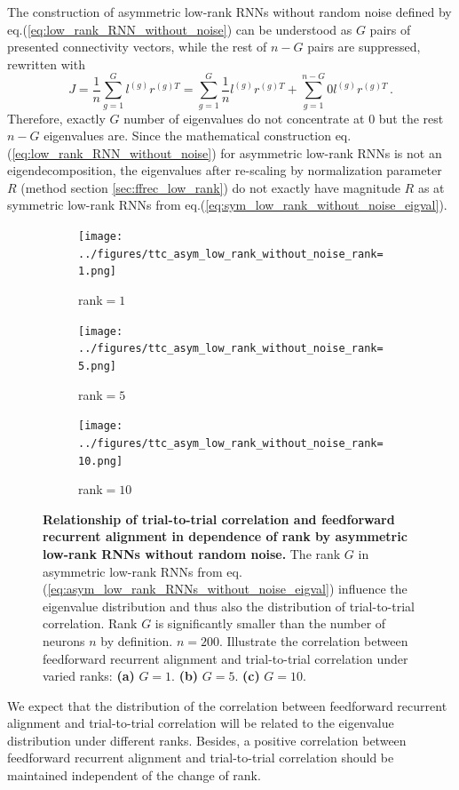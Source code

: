 \documentclass[11pt]{article}
\begin{document}
	The construction of asymmetric low-rank RNNs without random noise defined by eq.(\ref{eq:low_rank_RNN_without_noise}) can be understood as $G$ pairs of presented connectivity vectors, while the rest of $n-G$ pairs are suppressed, rewritten with
		\begin{equation} \label{eq:asym_low_rank_RNNs_without_noise_eigval}
			J = \frac{1}{n} \sum_{g=1}^{G} l^{(g)} r^{(g)T} = \sum_{g=1}^{G} \frac{1}{n} l^{(g)} r^{(g)T} + \sum_{g=1}^{n-G} 0 l^{(g)} r^{(g)T} \, .
		\end{equation}
	Therefore, exactly $G$ number of eigenvalues do not concentrate at $0$ but the rest $n-G$ eigenvalues are. Since the mathematical construction eq.(\ref{eq:low_rank_RNN_without_noise}) for asymmetric low-rank RNNs is not an eigendecomposition, the eigenvalues after re-scaling by normalization parameter $R$ (method section \ref{sec:ffrec_low_rank}) do not exactly have magnitude $R$ as at symmetric low-rank RNNs from eq.(\ref{eq:sym_low_rank_without_noise_eigval}).	
	
		\begin{figure}[H]
			\centering
			\begin{subfigure}[b]{0.3\textwidth}
				\texttt{[image: ../figures/ttc\_asym\_low\_rank\_without\_noise\_rank=1.png]}
				\caption{rank$=1$}
			\end{subfigure}
			\begin{subfigure}[b]{0.3\textwidth}
				\texttt{[image: ../figures/ttc\_asym\_low\_rank\_without\_noise\_rank=5.png]}
				\caption{rank$=5$}
			\end{subfigure}
			\begin{subfigure}[b]{0.3\textwidth}
				\texttt{[image: ../figures/ttc\_asym\_low\_rank\_without\_noise\_rank=10.png]}
				\caption{rank$=10$}
			\end{subfigure} 
			\caption{\textbf{Relationship of trial-to-trial correlation and feedforward recurrent alignment in dependence of rank by asymmetric low-rank RNNs without random noise.} The rank $G$ in asymmetric low-rank RNNs from eq.(\ref{eq:asym_low_rank_RNNs_without_noise_eigval}) influence the eigenvalue distribution and thus also the distribution of trial-to-trial correlation. Rank $G$ is significantly smaller than the number of neurons $n$ by definition. $n=200$. Illustrate the correlation between feedforward recurrent alignment and trial-to-trial correlation under varied ranks: \textbf{(a)} $G=1$. \textbf{(b)} $G=5$. \textbf{(c)} $G=10$.} 
			\label{fig:ttc_asym_low_rank_RNN_without_noise}
		\end{figure}
	We expect that the distribution of the correlation between feedforward recurrent alignment and trial-to-trial correlation will be related to the eigenvalue distribution under different ranks. Besides, a positive correlation between feedforward recurrent alignment and trial-to-trial correlation should be maintained independent of the change of rank.
	
\end{document}
